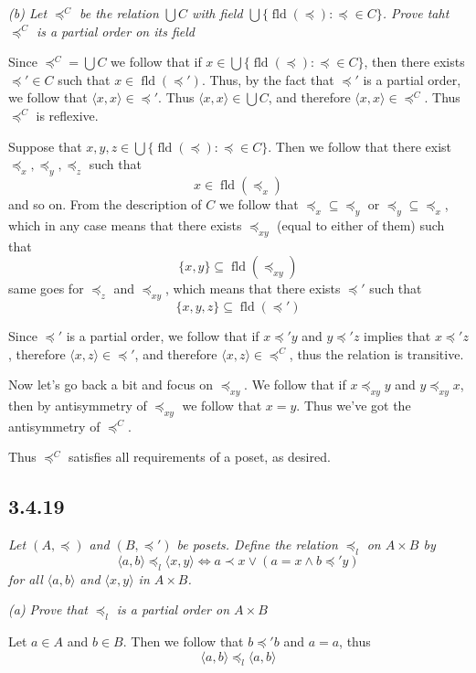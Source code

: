 \documentclass[11pt,oneside,titlepage]{book}
\DeclareMathOperator \fld {fld}
\newcommand{\eangle}[1]{\langle #1 \rangle}
\begin{document}
\textit{(b) Let $\preceq^C$ be the relation $\bigcup C$ with field
  $\bigcup\{\fld(\preceq): \preceq \in C\}$. Prove taht $\preceq^C$ is a partial order
  on its field}

Since $\preceq^C = \bigcup C$ we follow that if $x \in \bigcup\{\fld(\preceq): \preceq \in C\}$,
then there exists $\preceq' \in C$ such that $x \in \fld(\preceq')$. Thus, by
the fact that $\preceq'$ is a partial order, we follow that $\eangle{x, x} \in \preceq'$. Thus
$\eangle{x, x} \in \bigcup C$, and therefore $\eangle{x, x} \in \preceq^C$. Thus
$\preceq^C$ is reflexive.

Suppose that $x, y, z \in \bigcup\{\fld(\preceq): \preceq \in C\}$. Then we follow that
there exist $\preceq_x, \preceq_y, \preceq_z$ such that
$$x \in \fld(\preceq_x)$$
and so on. From the description of $C$ we follow that $\preceq_x \subseteq \preceq_y$
or $\preceq_y \subseteq \preceq_x$, which in any case means that there exists
$\preceq_{xy}$ (equal to either of them) such that
$$\{x, y\} \subseteq \fld(\preceq_{xy})$$
same goes for $\preceq_z$ and $\preceq_{xy}$, which means that there exists $\preceq'$ such that
$$\{x, y, z\} \subseteq \fld(\preceq')$$

Since $\preceq'$ is a partial order, we follow that if $x \preceq' y$ and $y \preceq' z$
implies that $x \preceq' z$, therefore $\eangle{x, z} \in \preceq'$, and therefore
$\eangle{x, z} \in \preceq^C$, thus the relation is transitive.

Now let's go back a bit and focus on $\preceq_{xy}$. We follow that if $x \preceq_{xy} y$
and $y \preceq_{xy} x$, then by antisymmetry of $\preceq_{xy}$ we follow that $x = y$. Thus
we've got the antisymmetry of $\preceq^C$.

Thus $\preceq^C$ satisfies all requirements of a poset, as desired.

\subsection*{3.4.19}

\textit{Let $(A, \preceq)$ and $(B, \preceq')$ be posets. Define the relation $\preceq_l$ on
  $A \times B$ by
  $$ \eangle{a, b} \preceq_l \eangle{x, y} \iff a \prec x \lor (a = x \land b \preceq' y) $$
  for all $\eangle{a, b}$ and $\eangle{x, y}$ in $A \times B$. }

\textit{(a) Prove that $\preceq_l$ is a partial order on $A \times B$}

Let $a \in A$ and $b \in B$. Then we follow that $b \preceq' b$ and $a = a$, thus
$$\eangle{a, b} \preceq_l \eangle{a, b}$$
\end{document}
